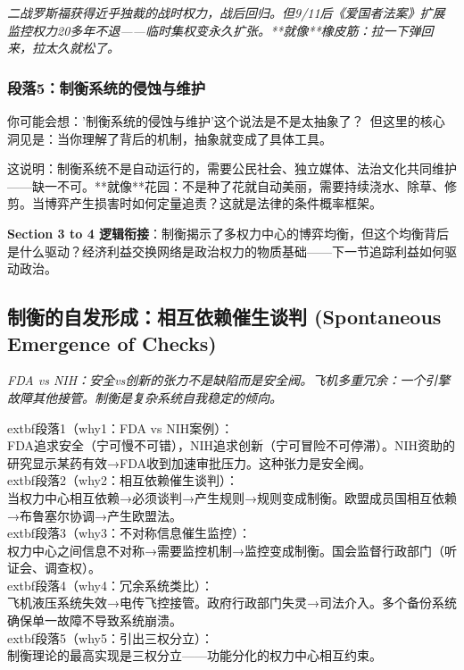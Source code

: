 \documentclass[a4paper,12pt]{book}
\newenvironment{motivation}{\begin{tcolorbox}[colback=gray!10,colframe=gray!60,title=\textit{本章动机},fonttitle=\bfseries,arc=0mm,leftrule=3mm]\small\itshape}{\end{tcolorbox}}
\begin{document}
\begin{motivation}
\begin{motivation}
\begin{motivation}
二战罗斯福获得近乎独裁的战时权力，战后回归。但9/11后《爱国者法案》扩展监控权力20多年不退——临时集权变永久扩张。**就像**橡皮筋：拉一下弹回来，拉太久就松了。

	\subsubsection*{段落5：制衡系统的侵蚀与维护}

	\begin{tcolorbox}[colback=yellow!5, title=\textit{读者行为预测}]
		你可能会想：'制衡系统的侵蚀与维护'这个说法是不是太抽象了？\ 但这里的核心洞见是：当你理解了背后的机制，抽象就变成了具体工具。
	\end{tcolorbox}

这说明：制衡系统不是自动运行的，需要公民社会、独立媒体、法治文化共同维护——缺一不可。**就像**花园：不是种了花就自动美丽，需要持续浇水、除草、修剪。当博弈产生损害时如何定量追责？这就是法律的条件概率框架。

	\textbf{Section 3 to 4 逻辑衔接}：制衡揭示了多权力中心的博弈均衡，但这个均衡背后是什么驱动？经济利益交换网络是政治权力的物质基础——下一节追踪利益如何驱动政治。

	
	\subsection{制衡的自发形成：相互依赖催生谈判 (Spontaneous Emergence of Checks)}
	\begin{motivation}FDA vs NIH：安全vs创新的张力不是缺陷而是安全阀。飞机多重冗余：一个引擎故障其他接管。制衡是复杂系统自我稳定的倾向。\end{motivation}
		extbf{段落1（why1：FDA vs NIH案例）}：\\FDA追求安全（宁可慢不可错），NIH追求创新（宁可冒险不可停滞）。NIH资助的研究显示某药有效→FDA收到加速审批压力。这种张力是安全阀。\\	extbf{段落2（why2：相互依赖催生谈判）}：\\当权力中心相互依赖→必须谈判→产生规则→规则变成制衡。欧盟成员国相互依赖→布鲁塞尔协调→产生欧盟法。\\	extbf{段落3（why3：不对称信息催生监控）}：\\权力中心之间信息不对称→需要监控机制→监控变成制衡。国会监督行政部门（听证会、调查权）。\\	extbf{段落4（why4：冗余系统类比）}：\\飞机液压系统失效→电传飞控接管。政府行政部门失灵→司法介入。多个备份系统确保单一故障不导致系统崩溃。\\	extbf{段落5（why5：引出三权分立）}：\\制衡理论的最高实现是三权分立——功能分化的权力中心相互约束。


\end{motivation}
\end{motivation}
\end{motivation}
\end{document}
